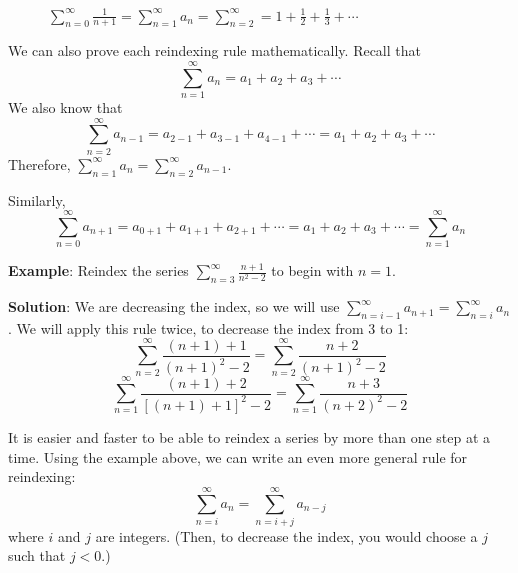 \begin{figure}[htbp]
\centering
    \caption{$\sum_{n=0}^\infty \frac{1}{n + 1} = \sum_{n=1}^\infty a_n = 
    \sum_{n=2}^\infty = 1 + \frac{1}{2} + \frac{1}{3} + \cdots$}
    \label{fig:reindex}
\end{figure}

We can also prove each reindexing rule mathematically. Recall that 
$$\sum_{n=1}^\infty a_n = a_1 + a_2 + a_3 + \cdots$$
We also know that 
$$\sum_{n=2}^\infty a_{n-1} = a_{2-1} + a_{3-1} + a_{4-1} + \cdots = a_1 + a_2 
+ a_3 + \cdots$$
Therefore, $\sum_{n=1}^\infty a_n = \sum_{n=2}^\infty a_{n-1}$. 

Similarly, 
$$\sum_{n=0}^\infty a_{n + 1} = a_{0+1} + a_{1+1} + a_{2+1} + \cdots = a_1 + 
a_2 + a_3 + \cdots = \sum_{n=1}^\infty a_n$$

\textbf{Example}: Reindex the series $\sum_{n=3}^\infty \frac{n + 1}{n^2 - 2}$ 
to begin with $n=1$.

\textbf{Solution}: We are decreasing the index, so we will use $\sum_{n=i-1}^
\infty a_{n+1} = \sum_{n=i}^\infty a_n$. We will apply this rule twice, to 
decrease the index from 3 to 1:
$$\sum_{n=2}^\infty \frac{(n + 1) + 1}{(n + 1)^2 - 2} = \sum_{n=2}^\infty 
\frac{n + 2}{(n + 1)^2 - 2}$$
$$\sum_{n=1}^\infty \frac{(n + 1) + 2}{\left[ (n + 1) + 1 \right]^2 - 2} = 
\sum_{n=1}^\infty \frac{n + 3}{(n + 2)^2 - 2}$$

It is easier and faster to be able to reindex a series by more than one step 
at a time. Using the example above, we can write an even more general rule for 
reindexing:
$$\sum_{n=i}^\infty a_n = \sum_{n=i + j}^\infty a_{n - j}$$
where $i$ and $j$ are integers. (Then, to decrease the index, you would choose 
a $j$ such that $j < 0$.)

